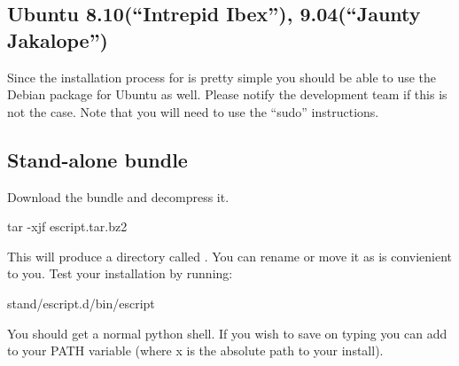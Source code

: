 \subsection{Ubuntu 8.10(``Intrepid Ibex''), 9.04(``Jaunty Jakalope'')}

Since the installation process for \esfinley is pretty simple you should be able to use the Debian package for Ubuntu as well.
Please notify the development team if this is not the case.
Note that you will need to use the ``sudo'' instructions.


\subsection{Stand-alone bundle}\label{sec:standalonelinux}

Download the bundle and decompress it.
\begin{shellCode}
tar -xjf escript.tar.bz2 
\end{shellCode}
This will produce a directory called . 
You can rename or move it as is convienient to you.
Test your installation by running:
\begin{shellCode}
 stand/escript.d/bin/escript
\end{shellCode}
You should get a normal python shell.
If you wish to save on typing you can add  to your PATH variable (where x is the absolute path to your install). 




